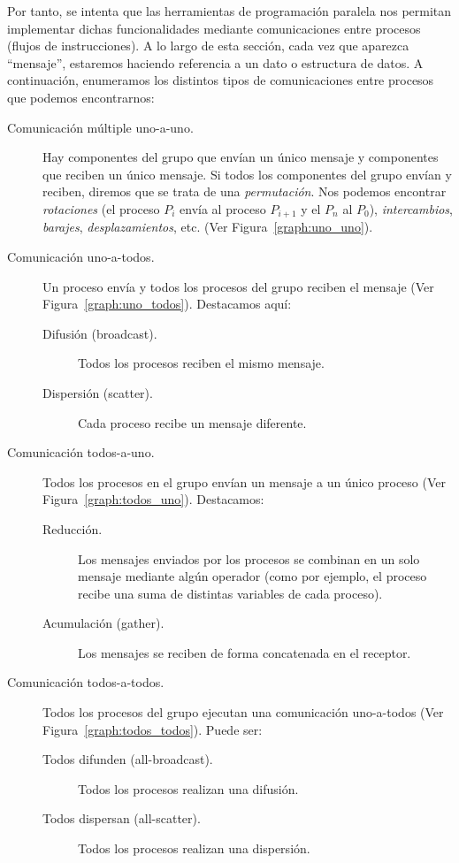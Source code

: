 Por tanto, se intenta que las herramientas de programación paralela nos permitan implementar dichas funcionalidades mediante comunicaciones entre procesos (flujos de instrucciones). A lo largo de esta sección, cada vez que aparezca ``mensaje'', estaremos haciendo referencia a un dato o estructura de datos. A continuación, enumeramos los distintos tipos de comunicaciones entre procesos que podemos encontrarnos:
\begin{description} 
    \item [Comunicación múltiple uno-a-uno.] Hay componentes del grupo que envían un único mensaje y componentes que reciben un único mensaje. Si todos los componentes del grupo envían y reciben, diremos que se trata de una \emph{permutación}. Nos podemos encontrar \emph{rotaciones} (el proceso $P_i$ envía al proceso $P_{i+1}$ y el $P_n$ al $P_0$), \emph{intercambios}, \emph{barajes}, \emph{desplazamientos}, etc. (Ver Figura~\ref{graph:uno_uno}).

    \item [Comunicación uno-a-todos.] Un proceso envía y todos los procesos del grupo reciben el mensaje (Ver Figura~\ref{graph:uno_todos}). Destacamos aquí:
        \begin{description}
            \item [Difusión (broadcast).] Todos los procesos reciben el mismo mensaje.
            \item [Dispersión (scatter).] Cada proceso recibe un mensaje diferente.
        \end{description}

    \item [Comunicación todos-a-uno.] Todos los procesos en el grupo envían un mensaje a un único proceso (Ver Figura~\ref{graph:todos_uno}). Destacamos:
        \begin{description}
            \item [Reducción.] Los mensajes enviados por los procesos se combinan en un solo mensaje mediante algún operador (como por ejemplo, el proceso recibe una suma de distintas variables de cada proceso).
            \item [Acumulación (gather).] Los mensajes se reciben de forma concatenada en el receptor.
        \end{description}

    \item [Comunicación todos-a-todos.] Todos los procesos del grupo ejecutan una comunicación uno-a-todos (Ver Figura~\ref{graph:todos_todos}). Puede ser:
        \begin{description}
            \item [Todos difunden (all-broadcast).] Todos los procesos realizan una difusión.
            \item [Todos dispersan (all-scatter).] Todos los procesos realizan una dispersión.
        \end{description}


\end{description}
